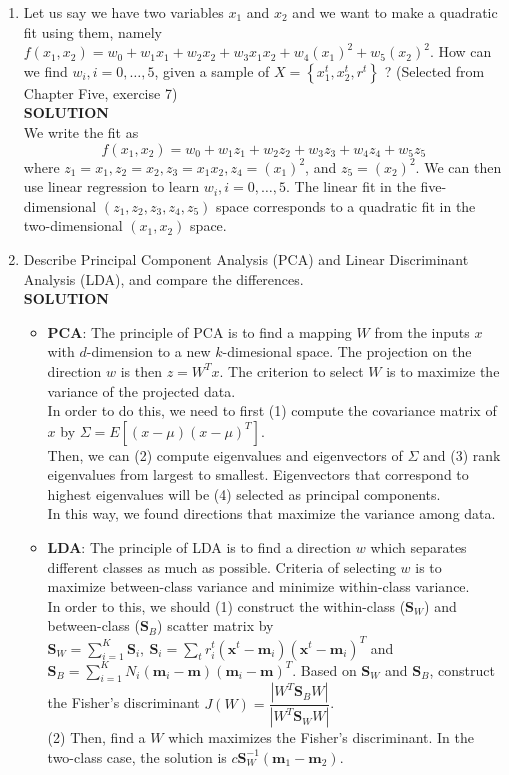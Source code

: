 \documentclass{article}
\begin{document}
\begin{enumerate}
    \item Let us say we have two variables $x_1$ and $x_2$ and we want to make a quadratic fit using them,
    namely $f\left(x_1, x_2\right)=w_0+w_1 x_1+w_2 x_2+w_3 x_1 x_2+w_4\left(x_1\right)^2+w_5\left(x_2\right)^2$. How can we find $w_i, i=0, \ldots, 5$, given a sample of $X=\left\{x_1^t, x_2^t, r^t\right\}$ ? (Selected from Chapter Five, exercise 7)\\
\textbf{SOLUTION}\\
We write the fit as
$$
f\left(x_1, x_2\right)=w_0+w_1 z_1+w_2 z_2+w_3 z_3+w_4 z_4+w_5 z_5
$$
where $z_1=x_1, z_2=x_2, z_3=x_1 x_2, z_4=\left(x_1\right)^2$, and $z_5=\left(x_2\right)^2$. We can then use linear regression to learn $w_i, i=0, \ldots, 5$. The linear fit in the five-dimensional $\left(z_1, z_2, z_3, z_4, z_5\right)$ space corresponds to a quadratic fit in the two-dimensional $\left(x_1, x_2\right)$ space. 
    \item Describe Principal Component Analysis (PCA) and Linear Discriminant Analysis (LDA), and compare the differences.\\
    \textbf{SOLUTION}
    \begin{itemize}
        \item \textbf{PCA}: The principle of PCA is to find a mapping $W$ from the inputs $x$ with $d$-dimension to a new $k$-dimesional space. The projection on the direction $w$ is then $z=W^Tx$. The criterion to select $W$ is to maximize the variance of the projected data. \\
        In order to do this, we need to first (1) compute the covariance matrix of $x$ by $\Sigma = E\left[(x-\mu)(x-\mu)^T\right]$.\\
        Then, we can (2) compute eigenvalues and eigenvectors of $\Sigma$ and (3) rank eigenvalues from largest to smallest. Eigenvectors that correspond to highest eigenvalues will be (4) selected as principal components.\\
        In this way, we found directions that maximize the variance among data.

        \item \textbf{LDA}: The principle of LDA is to find a direction $w$ which separates different classes as much as possible. Criteria of selecting $w$ is to maximize between-class variance and minimize within-class variance.\\
        In order to this, we should (1) construct the within-class ($\mathbf{S}_W$) and between-class ($\mathbf{S}_B$) scatter matrix by $\mathbf{S}_W=\sum_{i=1}^K \boldsymbol{S}_i,~\mathbf{S}_i=\sum_t r_i^t\left(\boldsymbol{x}^t-\boldsymbol{m}_i\right)\left(\boldsymbol{x}^t-\boldsymbol{m}_i\right)^T$ and $\mathbf{S}_B=\sum_{i=1}^K N_i\left(\boldsymbol{m}_i-\boldsymbol{m}\right)\left(\boldsymbol{m}_i-\boldsymbol{m}\right)^T$. Based on $\mathbf{S}_W$ and $\mathbf{S}_B$, construct the Fisher's discriminant $J(W) = \dfrac{|W^T\mathbf{S}_BW|}{|W^T\mathbf{S}_WW|}$.\\
        (2) Then, find a $W$ which maximizes the Fisher's discriminant. In the two-class case, the solution is $c\boldsymbol{S}_W^{-1}(\boldsymbol{m}_1-\boldsymbol{m}_2)$.


\end{itemize}
\end{enumerate}
\end{document}
